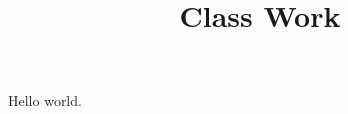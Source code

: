\documentclass[12pt]{article}
\title{Class Work}
\date{}
\begin{document}
	\maketitle
	Hello world.
\end{document}
